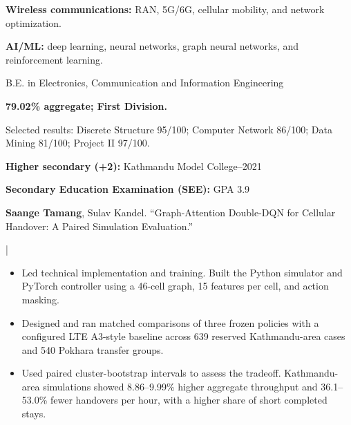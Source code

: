 \documentclass[11pt,letterpaper]{article}
\begin{document}
\fontsize{10.6}{13.3}\selectfont
\nameheader

\textbf{Wireless communications:} RAN, 5G/6G, cellular mobility, and network optimization.\par
\textbf{AI/ML:} deep learning, neural networks, graph neural networks, and reinforcement learning.

B.E. in Electronics, Communication and Information Engineering\par
{}
\textbf{79.02\% aggregate; First Division.}\par
Selected results: Discrete Structure 95/100; Computer Network 86/100; Data Mining 81/100; Project II 97/100.\par
\vspace{3pt}
\textbf{Higher secondary (+2):} Kathmandu Model College\hfill{\color{muted}\fontsize{10}{12}--2021}\par
\textbf{Secondary Education Examination (SEE):} GPA 3.9\hfill{\color{muted}\fontsize{10}{12}}

\textbf{Saange Tamang}, Sulav Kandel. ``Graph-Attention Double-DQN for Cellular Handover: A Paired Simulation Evaluation.''\par
{}
\paperlink\enspace |\enspace\codelink

\begin{itemize}
\item Led technical implementation and training. Built the Python simulator and PyTorch controller using a 46-cell graph, 15 features per cell, and action masking.
\item Designed and ran matched comparisons of three frozen policies with a configured LTE A3-style baseline across 639 reserved Kathmandu-area cases and 540 Pokhara transfer groups.
\item Used paired cluster-bootstrap intervals to assess the tradeoff. Kathmandu-area simulations showed 8.86--9.99\% higher aggregate throughput and 36.1--53.0\% fewer handovers per hour, with a higher share of short completed stays.
\end{itemize}
\end{document}
